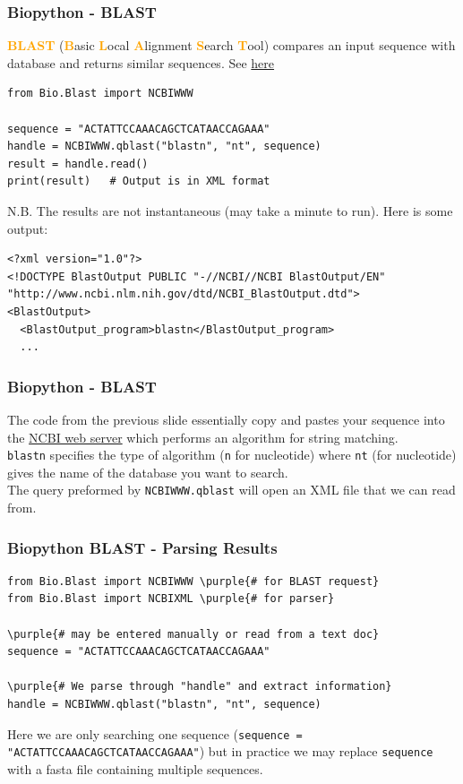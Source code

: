 \documentclass[xcolor=svgnames, handout]{beamer}
\newcommand{\purple}[1]{{\textcolor{purple}{#1}}}
\newcommand{\nl}{\\[1em]}
\newcommand{\define}[1]{\textbf{\textcolor{orange}{#1}}}
\newcommand{\ft}[1]{\frametitle{#1}}
\begin{document}
\begin{frame}[fragile]\ft{Biopython - BLAST}
\define{BLAST} (\define Basic \define Local \define Alignment \define Search \define Tool) compares an input sequence with database and returns similar sequences. See \href{http://blast.ncbi.nlm.nih.gov/}{here} 
\begin{Verbatim}[xleftmargin=.1in, frame=single] 
from Bio.Blast import NCBIWWW

sequence = "ACTATTCCAAACAGCTCATAACCAGAAA"
handle = NCBIWWW.qblast("blastn", "nt", sequence)
result = handle.read()
print(result)	# Output is in XML format
\end{Verbatim}
N.B.  The results are not instantaneous (may take a minute to run). Here is some output:
\begin{Verbatim}[frame=single, fontsize=\small]
<?xml version="1.0"?>
<!DOCTYPE BlastOutput PUBLIC "-//NCBI//NCBI BlastOutput/EN" "http://www.ncbi.nlm.nih.gov/dtd/NCBI_BlastOutput.dtd">
<BlastOutput>
  <BlastOutput_program>blastn</BlastOutput_program>
  ...
\end{Verbatim}

\end{frame}

\begin{frame}[fragile]\ft{Biopython - BLAST}
The  code from the previous slide essentially copy and pastes your sequence into the \href{https://blast.ncbi.nlm.nih.gov/Blast.cgi?PROGRAM=blastn&PAGE_TYPE=BlastSearch&LINK_LOC=blasthome}{NCBI web server} which  performs an algorithm for string matching.\nl
{\tt blastn} specifies the type of algorithm ({\tt n} for nucleotide) where {\tt nt}  (for nucleotide) gives the name of the database you want to search.\nl 

The query preformed by {\tt NCBIWWW.qblast} will open an XML  file that we can read from.\nl



\end{frame}


\begin{frame}[fragile]\ft{Biopython BLAST - Parsing Results}\label{intblast}
%
\begin{Verbatim}[xleftmargin=.1in, commandchars=\\\{\}, frame=single] 
from Bio.Blast import NCBIWWW \purple{# for BLAST request}
from Bio.Blast import NCBIXML \purple{# for parser}

\purple{# may be entered manually or read from a text doc}
sequence = "ACTATTCCAAACAGCTCATAACCAGAAA"

\purple{# We parse through "handle" and extract information}
handle = NCBIWWW.qblast("blastn", "nt", sequence)
\end{Verbatim}
Here we are only searching one sequence ({\tt sequence = "ACTATTCCAAACAGCTCATAACCAGAAA"}) but in practice we may replace {\tt sequence} with a fasta file containing multiple sequences. 
\end{frame}
\end{document}
